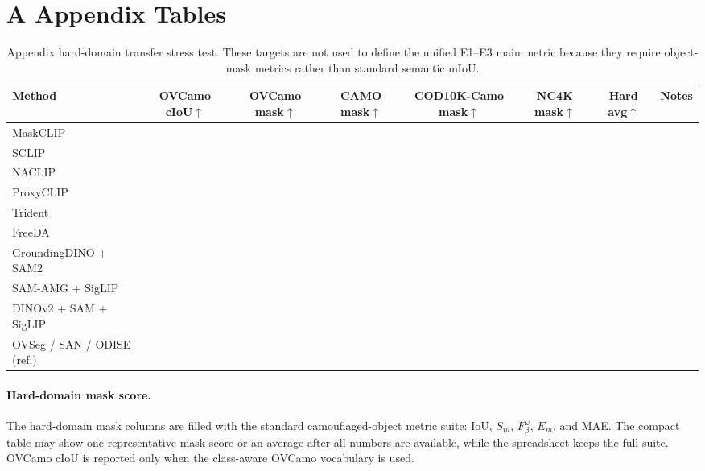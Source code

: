 \documentclass[11pt,a4paper]{article}
\newcommand{\up}{\ensuremath{\uparrow}}
\begin{document}
\clearpage

\section*{A Appendix Tables}

\begin{table}[H]
\centering
\scriptsize
\caption{Appendix hard-domain transfer stress test. These targets are not used to define the unified E1--E3 main metric because they require object-mask metrics rather than standard semantic mIoU.}
\label{tab:appendix-hard-domain}
\begin{adjustbox}{max width=\textwidth}
\begin{tabular}{l c c c c c c c}
\toprule
Method & OVCamo cIoU\up & OVCamo mask\up & CAMO mask\up & COD10K-Camo mask\up & NC4K mask\up & Hard avg\up & Notes \\
\midrule
MaskCLIP & & & & & & & \\
SCLIP & & & & & & & \\
NACLIP & & & & & & & \\
ProxyCLIP & & & & & & & \\
Trident & & & & & & & \\
FreeDA & & & & & & & \\
GroundingDINO + SAM2 & & & & & & & \\
SAM-AMG + SigLIP & & & & & & & \\
DINOv2 + SAM + SigLIP & & & & & & & \\
OVSeg / SAN / ODISE (ref.) & & & & & & & \\
\bottomrule
\end{tabular}
\end{adjustbox}
\end{table}

\paragraph{Hard-domain mask score.}
The hard-domain mask columns are filled with the standard camouflaged-object metric suite: IoU, $S_m$, $F^\omega_\beta$, $E_m$, and MAE. The compact table may show one representative mask score or an average after all numbers are available, while the spreadsheet keeps the full suite. OVCamo cIoU is reported only when the class-aware OVCamo vocabulary is used.
\end{document}

